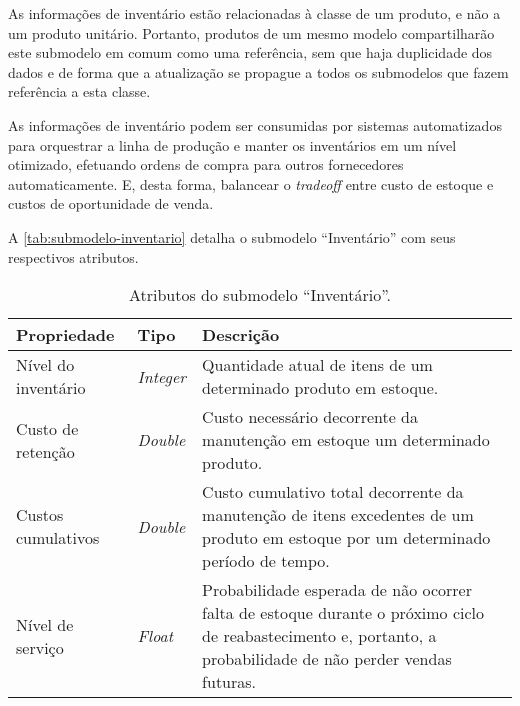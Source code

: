 As informações de inventário estão relacionadas à classe de um produto, e não a um produto unitário. Portanto, produtos de um mesmo modelo compartilharão este submodelo em comum como uma referência, sem que haja duplicidade dos dados e de forma que a atualização se propague a todos os submodelos que fazem referência a esta classe.

As informações de inventário podem ser consumidas por sistemas automatizados para orquestrar a linha de produção e manter os inventários em um nível otimizado, efetuando ordens de compra para outros fornecedores automaticamente. E, desta forma, balancear o \textit{tradeoff} entre custo de estoque e custos de oportunidade de venda.

A \autoref{tab:submodelo-inventario} detalha o submodelo ``Inventário'' com seus respectivos atributos.

\begin{table}[htb]
	\centering
	\caption{Atributos do submodelo ``Inventário''.}
	\begin{tabular}{p{3.5cm}p{1.5cm}p{9cm}}
		\hline
		\textbf{Propriedade}
		 & \textbf{Tipo}
		 & \textbf{Descrição}                                                                                                                                           \\

		\hline
		Nível do inventário
		 & \textit{Integer}
		 & Quantidade atual de itens de um determinado produto em estoque.                                                                                              \\

		\hline
		Custo de retenção
		 & \textit{Double}
		 & Custo necessário decorrente da manutenção em estoque um determinado produto.                                                                                 \\

		\hline
		Custos cumulativos
		 & \textit{Double}
		 & Custo cumulativo total decorrente da manutenção de itens excedentes de um produto em estoque por um determinado período de tempo.                            \\

		\hline
		Nível de serviço
		 & \textit{Float}
		 & Probabilidade esperada de não ocorrer falta de estoque durante o próximo ciclo de reabastecimento e, portanto, a probabilidade de não perder vendas futuras. \\

		\hline
	\end{tabular}
	\label{tab:submodelo-inventario}
\end{table}

